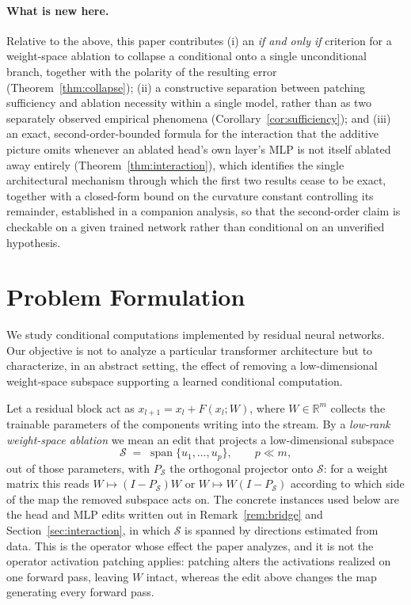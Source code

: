 \documentclass[11pt,a4paper]{article}
\begin{document}
\paragraph{What is new here.} Relative to the above, this paper contributes
(i) an \emph{if and only if} criterion for a weight-space ablation to collapse
a conditional onto a single unconditional branch, together with the polarity
of the resulting error (Theorem~\ref{thm:collapse}); (ii) a constructive
separation between patching sufficiency and ablation necessity within a
single model, rather than as two separately observed empirical phenomena
(Corollary~\ref{cor:sufficiency}); and (iii) an exact, second-order-bounded
formula for the interaction that the additive picture omits whenever an
ablated head's own layer's MLP is not itself ablated away entirely
(Theorem~\ref{thm:interaction}), which identifies the single architectural
mechanism through which the first two results cease to be exact, together
with a closed-form bound on the curvature constant controlling its
remainder, established in a companion analysis, so that the second-order
claim is checkable on a given trained network rather than conditional on an
unverified hypothesis.

\section{Problem Formulation}
\label{sec:problem}

We study conditional computations implemented by residual neural networks.
Our objective is not to analyze a particular transformer architecture but to
characterize, in an abstract setting, the effect of removing a low-dimensional
weight-space subspace supporting a learned conditional computation.

Let a residual block act as $x_{l+1}=x_l+F(x_l;W)$, where $W\in\mathbb R^m$
collects the trainable parameters of the components writing into the stream.
By a \emph{low-rank weight-space ablation} we mean an edit that projects a
low-dimensional subspace
\[
\mathcal S \;=\; \operatorname{span}\{u_1,\ldots,u_p\},
\qquad p\ll m,
\]
out of those parameters, with $P_{\mathcal S}$ the orthogonal projector onto
$\mathcal S$: for a weight matrix this reads $W\mapsto(I-P_{\mathcal S})W$ or
$W\mapsto W(I-P_{\mathcal S})$ according to which side of the map the removed
subspace acts on. The concrete instances used below are the head and MLP
edits written out in Remark~\ref{rem:bridge} and
Section~\ref{sec:interaction}, in which $\mathcal S$ is spanned by directions
estimated from data. This is the operator whose effect the paper analyzes,
and it is not the operator activation patching applies: patching alters the
activations realized on one forward pass, leaving $W$ intact, whereas the
edit above changes the map generating every forward pass.
\end{document}

